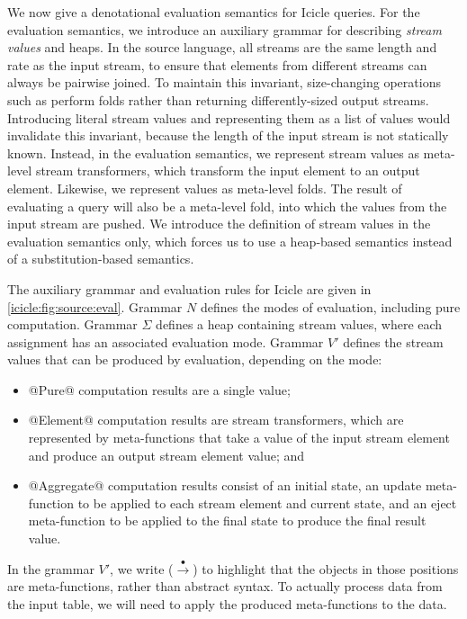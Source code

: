 We now give a denotational evaluation semantics for Icicle queries.
For the evaluation semantics, we introduce an auxiliary grammar for describing \emph{stream values} and heaps.
In the source language, all streams are the same length and rate as the input stream, to ensure that elements from different streams can always be pairwise joined.
To maintain this invariant, size-changing operations such as \Ic@filter@ perform folds rather than returning differently-sized output streams.
Introducing literal stream values and representing them as a list of values would invalidate this invariant, because the length of the input stream is not statically known.
Instead, in the evaluation semantics, we represent \Ic@Element@ stream values as meta-level stream transformers, which transform the input element to an output element.
Likewise, we represent \Ic@Aggregate@ values as meta-level folds.
The result of evaluating a query will also be a meta-level fold, into which the values from the input stream are pushed.
We introduce the definition of stream values in the evaluation semantics only, which forces us to use a heap-based semantics instead of a substitution-based semantics.

The auxiliary grammar and evaluation rules for Icicle are given in \cref{icicle:fig:source:eval}.
Grammar $N$ defines the modes of evaluation, including pure computation.
Grammar $\Sigma$ defines a heap containing stream values, where each assignment has an associated evaluation mode.
Grammar $V'$ defines the stream values that can be produced by evaluation, depending on the mode:
\begin{itemize}
\item
@Pure@ computation results are a single value;
\item
@Element@ computation results are stream transformers, which are represented by meta-functions that take a value of the input stream element and produce an output stream element value; and
\item
@Aggregate@ computation results consist of an initial state, an update meta-function to be applied to each stream element and current state, and an eject meta-function to be applied to the final state to produce the final result value.
\end{itemize}



In the grammar $V'$, we write ($\stackrel{\bullet}{\to}$) to highlight that the objects in those positions are meta-functions, rather than abstract syntax.
To actually process data from the input table, we will need to apply the produced meta-functions to the data.

